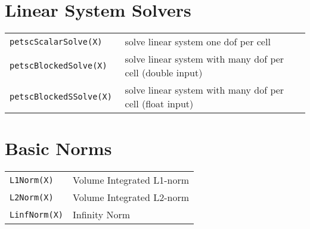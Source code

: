 \section{Linear System Solvers}

\begin{center}
\begin{tabular}[h]{|l|l|}
\hline
{\tt petscScalarSolve(X) } & solve linear system one dof per cell \\
{\tt petscBlockedSolve(X) } & solve linear system with many dof per cell (double input)\\
{\tt petscBlockedSSolve(X) } & solve linear system with many dof per cell (float input)\\
\hline
\end{tabular}
\end{center}

\section{Basic Norms}

\begin{center}
\begin{tabular}[h]{|l|l|}
\hline
{\tt L1Norm(X)} & Volume Integrated L1-norm \\
{\tt L2Norm(X)} & Volume Integrated L2-norm \\
{\tt LinfNorm(X)} & Infinity Norm \\
\hline
\end{tabular}
\end{center}

